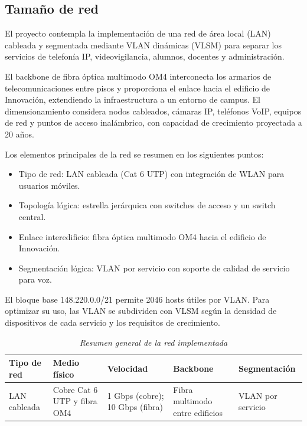 \subsection{Tamaño de red}

El proyecto contempla la implementación de una red de área local (LAN) cableada y segmentada mediante VLAN dinámicas (VLSM) para separar los servicios de telefonía IP, videovigilancia, alumnos, docentes y administración.

El backbone de fibra óptica multimodo OM4 interconecta los armarios de telecomunicaciones entre pisos y proporciona el enlace hacia el edificio de Innovación, extendiendo la infraestructura a un entorno de campus. El dimensionamiento considera nodos cableados, cámaras IP, teléfonos VoIP, equipos de red y puntos de acceso inalámbrico, con capacidad de crecimiento proyectada a 20 años.

Los elementos principales de la red se resumen en los siguientes puntos:

\begin{itemize}
  \item Tipo de red: LAN cableada (Cat 6 UTP) con integración de WLAN para usuarios móviles.
  \item Topología lógica: estrella jerárquica con switches de acceso y un switch central.
  \item Enlace interedificio: fibra óptica multimodo OM4 hacia el edificio de Innovación.
  \item Segmentación lógica: VLAN por servicio con soporte de calidad de servicio para voz.
\end{itemize}

El bloque base 148.220.0.0/21 permite 2046 hosts útiles por VLAN. Para optimizar su uso, las VLAN se subdividen con VLSM según la densidad de dispositivos de cada servicio y los requisitos de crecimiento.

\begin{table}[H]
  \caption{\textit{Resumen general de la red implementada}}
  \label{tab:resumen-red}
  \centering
  \begin{tabularx}{\textwidth}{l l l l X}
    	\toprule
    	\textbf{Tipo de red} & \textbf{Medio físico} & \textbf{Velocidad} & \textbf{Backbone} & \textbf{Segmentación} \\
    \midrule
    LAN cableada & Cobre Cat 6 UTP y fibra OM4 & 1 Gbps (cobre); 10 Gbps (fibra) & Fibra multimodo entre edificios & VLAN por servicio\\
    \bottomrule
  \end{tabularx}
\end{table}